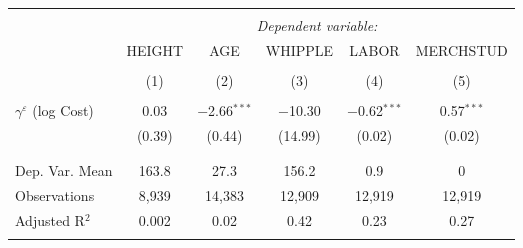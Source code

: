 
\begin{tabular}{@{\extracolsep{5pt}}lccccc} 
\\[-1.8ex]\hline 
\hline \\[-1.8ex] 
 & \multicolumn{5}{c}{\textit{Dependent variable:}} \\ 
\cline{2-6} 
 & HEIGHT & AGE & WHIPPLE & LABOR & MERCHSTUD \\ 
\\[-1.8ex] & (1) & (2) & (3) & (4) & (5)\\ 
\hline \\[-1.8ex] 
 $\gamma^{\varepsilon}$ (log Cost) & 0.03 & $-$2.66$^{***}$ & $-$10.30 & $-$0.62$^{***}$ & 0.57$^{***}$ \\ 
  & (0.39) & (0.44) & (14.99) & (0.02) & (0.02) \\ 
  & & & & & \\ 
\hline \\[-1.8ex] 
Dep. Var. Mean & 163.8 & 27.3 & 156.2 & 0.9 & 0 \\ 
Observations & 8,939 & 14,383 & 12,909 & 12,919 & 12,919 \\ 
Adjusted R$^{2}$ & 0.002 & 0.02 & 0.42 & 0.23 & 0.27 \\ 
\hline 
\hline \\[-1.8ex] 
\end{tabular} 
